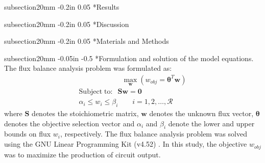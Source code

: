 \documentclass[12pt]{article}
\makeatletter
\renewcommand\subsection{\@startsection
	{subsection}{2}{0mm}
	{-0.05in}
	{-0.5\baselineskip}
	{\normalfont\normalsize\bfseries}}
\renewcommand\section{\@startsection
	{subsection}{2}{0mm}
	{-0.2in}
	{0.05\baselineskip}
	{\normalfont\large\bfseries}}
\makeatother
\begin{document}
\clearpage




\section*{Results}


\clearpage
\section*{Discussion}

\clearpage

\section*{Materials and Methods}

\subsection*{Formulation and solution of the model equations.}
The flux balance analysis problem was formulated as:
\begin{equation}\nonumber
 \begin{multlined}
	\qquad \qquad \qquad \max_{\boldsymbol{w}}{} \! \left( w_{obj} = \mathbf{\boldsymbol{\theta}}^T \boldsymbol{w} \right) \\
	\mathrm{Subject \; to:}
	 \; \; \mathbf{S}\mathbf{w}=\mathbf{0} \\
\alpha_i \leq w_i \leq \beta_i  \qquad i=1,2,\hdots,\mathcal{R}
 \end{multlined}
\end{equation}
where $\mathbf{S}$ denotes the stoichiometric matrix, $\mathbf{w}$ denotes the unknown flux vector, $\boldsymbol{\theta}$ denotes the objective selection vector
and $\alpha_i$ and $\beta_i$ denote the lower and upper bounds on flux $w_{i}$, respectively.
The flux balance analysis problem was solved using the GNU Linear Programming Kit (v4.52) \cite{GLPK}.
In this study, the objective $w_{obj}$ was to maximize the production of circuit output.
\end{document}
